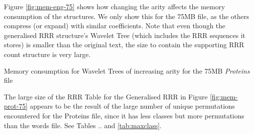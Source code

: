 Figure \ref{fig:mem-eng-75} shows how changing the arity affects the memory
consumption of the structures. We only show this for the 75MB file, as the 
others compress (or expand) with similar coefficients. Note that even though 
the generalised RRR structure's Wavelet Tree (which includes the RRR sequences 
it stores) is smaller than the original text, the size to contain the supporting 
RRR count structure is very large.

			{Memory consumption for Wavelet Trees of increasing arity for
			the 75MB \emph{Proteins} file}

The large size of the RRR Table for the Generalised RRR in Figure 
\ref{fig:mem-prot-75} appears to be the result of the large number of unique
permutations encountered for the Proteins file, since it has less classes but 
more permutations than the words file. See Tables .. and \ref{tab:maxclass}.


